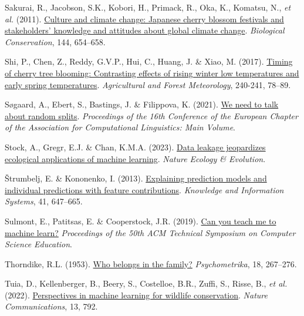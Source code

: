 \documentclass[
  letterpaper,
]{scrbook}
\newlength{\cslhangindent}
\newenvironment{CSLReferences}[2] %
 {\begin{list}{}{%
  \setlength{\itemindent}{0pt}
  \setlength{\leftmargin}{0pt}
  \setlength{\parsep}{0pt}
  \ifodd #1
   \setlength{\leftmargin}{\cslhangindent}
   \setlength{\itemindent}{-1\cslhangindent}
  \fi
  \setlength{\itemsep}{#2\baselineskip}}}
 {\end{list}}
\begin{document}
\begin{CSLReferences}{1}{0}
Sakurai, R., Jacobson, S.K., Kobori, H., Primack, R., Oka, K., Komatsu,
N., \emph{et al.} (2011).
\href{https://doi.org/10.1016/j.biocon.2010.09.028}{Culture and climate
change: Japanese cherry blossom festivals and stakeholders{'} knowledge
and attitudes about global climate change}. \emph{Biological
Conservation}, 144, 654--658.

Shi, P., Chen, Z., Reddy, G.V.P., Hui, C., Huang, J. \& Xiao, M. (2017).
\href{https://doi.org/10.1016/j.agrformet.2017.04.001}{Timing of cherry
tree blooming: Contrasting effects of rising winter low temperatures and
early spring temperatures}. \emph{Agricultural and Forest Meteorology},
240-241, 78--89.

Søgaard, A., Ebert, S., Bastings, J. \& Filippova, K. (2021).
\href{https://doi.org/10.18653/v1/2021.eacl-main.156}{We need to talk
about random splits}. \emph{Proceedings of the 16th Conference of the
European Chapter of the Association for Computational Linguistics: Main
Volume}.

Stock, A., Gregr, E.J. \& Chan, K.M.A. (2023).
\href{https://doi.org/10.1038/s41559-023-02162-1}{Data leakage
jeopardizes ecological applications of machine learning}. \emph{Nature
Ecology \& Evolution}.

Štrumbelj, E. \& Kononenko, I. (2013).
\href{https://doi.org/10.1007/s10115-013-0679-x}{Explaining prediction
models and individual predictions with feature contributions}.
\emph{Knowledge and Information Systems}, 41, 647--665.

Sulmont, E., Patitsas, E. \& Cooperstock, J.R. (2019).
\href{https://doi.org/10.1145/3287324.3287392}{Can you teach me to
machine learn?} \emph{Proceedings of the 50th ACM Technical Symposium on
Computer Science Education}.

Thorndike, R.L. (1953). \href{https://doi.org/10.1007/bf02289263}{Who
belongs in the family?} \emph{Psychometrika}, 18, 267--276.

Tuia, D., Kellenberger, B., Beery, S., Costelloe, B.R., Zuffi, S.,
Risse, B., \emph{et al.} (2022).
\href{https://doi.org/10.1038/s41467-022-27980-y}{Perspectives in
machine learning for wildlife conservation}. \emph{Nature
Communications}, 13, 792.


\end{CSLReferences}
\end{document}
